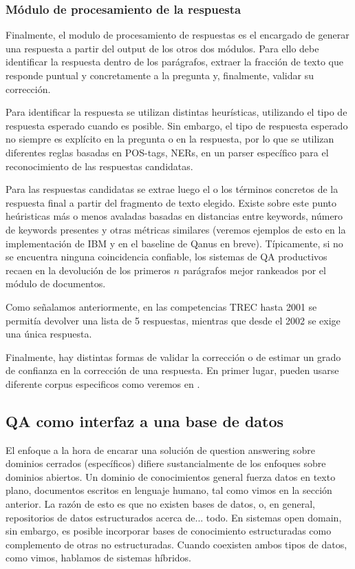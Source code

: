 \subsubsection*{Módulo de procesamiento de la respuesta}
Finalmente, el modulo de procesamiento de respuestas es el encargado de generar una respuesta a partir del output de los otros dos módulos. Para ello debe identificar la respuesta dentro de los parágrafos, extraer la fracción de texto que responde puntual y concretamente a la pregunta y, finalmente, validar su corrección. 

Para identificar la respuesta se utilizan distintas heurísticas, utilizando el tipo de respuesta esperado cuando es posible. Sin embargo, el tipo de respuesta esperado no siempre es explícito en la pregunta o en la respuesta, por lo que se utilizan diferentes reglas basadas en POS-tags, NERs, en un parser específico para el reconocimiento de las respuestas candidatas.

Para las respuestas candidatas se extrae luego el o los términos concretos de la respuesta final a partir del fragmento de texto elegido. Existe sobre este punto heúristicas más o menos avaladas basadas en distancias entre keywords, número de keywords presentes y otras métricas similares (veremos ejemplos de esto en la implementación de IBM y en el baseline de Qanus en breve). Típicamente, si no se encuentra ninguna coincidencia confiable, los sistemas de QA productivos recaen en la devolución de los primeros $n$ parágrafos mejor rankeados por el módulo de documentos. 

Como señalamos anteriormente, en las competencias TREC hasta 2001 se permitía devolver una lista de 5 respuestas, mientras que desde el 2002 se exige una única respuesta.

Finalmente, hay distintas formas de validar la corrección o de estimar un grado de confianza en la corrección de una respuesta. En primer lugar, pueden usarse diferente corpus especificos como veremos en .

\subsection{QA como interfaz a una base de datos}
\label{subsec:closed-domain}
El enfoque a la hora de encarar una solución de question answering sobre dominios cerrados (específicos) difiere sustancialmente de los enfoques sobre dominios abiertos. Un dominio de conocimientos general fuerza datos en texto plano, documentos escritos en lenguaje humano, tal como vimos en la sección anterior. La razón de esto es que no existen bases de datos, o, en general, repositorios de datos estructurados acerca de... todo. En sistemas open domain, sin embargo, es posible incorporar bases de conocimiento estructuradas como complemento de otras no estructuradas. Cuando coexisten ambos tipos de datos, como vimos, hablamos de sistemas híbridos. 

